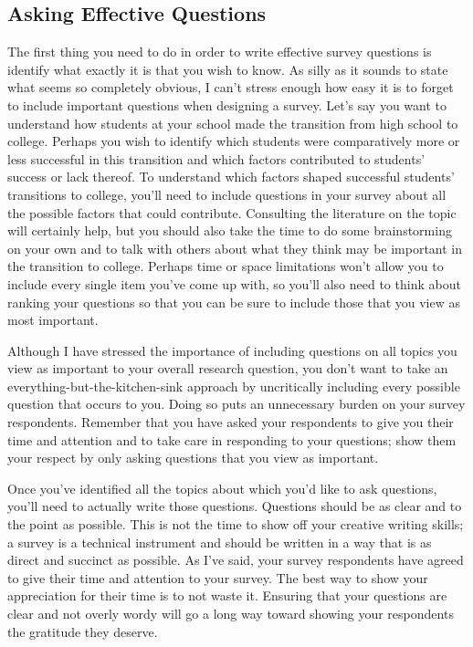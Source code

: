 \subsection{Asking Effective Questions}
The first thing you need to do in order to write effective survey questions is identify what exactly it is that you wish to know. As silly as it sounds to state what seems so completely obvious, I can’t stress enough how easy it is to forget to include important questions when designing a survey. Let’s say you want to understand how students at your school made the transition from high school to college. Perhaps you wish to identify which students were comparatively more or less successful in this transition and which factors contributed to students’ success or lack thereof. To understand which factors shaped successful students’ transitions to college, you’ll need to include questions in your survey about all the possible factors that could contribute. Consulting the literature on the topic will certainly help, but you should also take the time to do some brainstorming on your own and to talk with others about what they think may be important in the transition to college. Perhaps time or space limitations won’t allow you to include every single item you’ve come up with, so you’ll also need to think about ranking your questions so that you can be sure to include those that you view as most important.

Although I have stressed the importance of including questions on all topics you view as important to your overall research question, you don’t want to take an everything-but-the-kitchen-sink approach by uncritically including every possible question that occurs to you. Doing so puts an unnecessary burden on your survey respondents. Remember that you have asked your respondents to give you their time and attention and to take care in responding to your questions; show them your respect by only asking questions that you view as important.

Once you’ve identified all the topics about which you’d like to ask questions, you’ll need to actually write those questions. Questions should be as clear and to the point as possible. This is not the time to show off your creative writing skills; a survey is a technical instrument and should be written in a way that is as direct and succinct as possible. As I’ve said, your survey respondents have agreed to give their time and attention to your survey. The best way to show your appreciation for their time is to not waste it. Ensuring that your questions are clear and not overly wordy will go a long way toward showing your respondents the gratitude they deserve.

